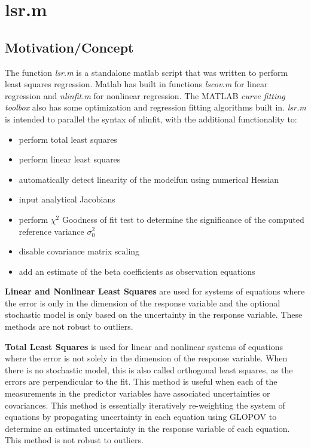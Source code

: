 \documentclass{article}
\begin{document}
	\section{lsr.m}
	
	\subsection{Motivation/Concept}
	The function \textit{lsr.m} is a standalone matlab script that was written to perform least squares regression.  Matlab has built in functions \textit{lscov.m} for linear regression and \textit{nlinfit.m} for nonlinear regression. The MATLAB \textit{curve fitting toolbox} also has some optimization and regression fitting algorithms built in.  \textit{lsr.m} is intended to parallel the syntax of nlinfit, with the additional functionality to:
	\begin{itemize}
		\item perform total least squares
		\item perform linear least squares
		\item automatically detect linearity of the modelfun using numerical Hessian
		\item input analytical Jacobians
		\item perform $\chi^2$ Goodness of fit test to determine the significance of the computed reference variance $\sigma_0^2$
		\item disable covariance matrix scaling
		\item add an estimate of the beta coefficients as observation equations
	\end{itemize}
	
	\textbf{Linear and Nonlinear Least Squares} are used for systems of equations where the error is only in the dimension of the response variable and the optional stochastic model is only based on the uncertainty in the response variable.  These methods are not robust to outliers.
	
	\textbf{Total Least Squares} is used for linear and nonlinear systems of equations where the error is not solely in the dimension of the response variable.  When there is no stochastic model, this is also called orthogonal least squares, as the errors are perpendicular to the fit.  This method is useful when each of the measurements in the predictor variables have associated uncertainties or covariances.  This method is essentially iteratively re-weighting the system of equations by propagating uncertainty in each equation using GLOPOV to determine an estimated uncertainty in the response variable of each equation.  This method is not robust to outliers.
	
\end{document}
